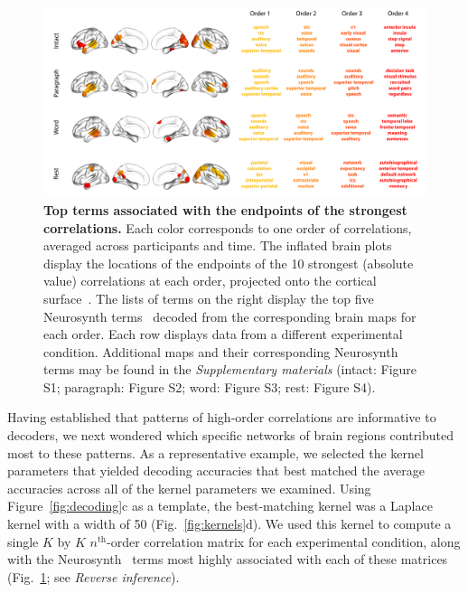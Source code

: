 \documentclass[english]{article}
\begin{document}
\begin{figure}[tp]
  \centering
  \includegraphics[width=\textwidth]{figs/most_abs}
  \caption{\textbf{Top terms associated with the endpoints of the
      strongest correlations.}  Each color corresponds to one order of
    correlations, averaged across participants and time. The inflated
    brain plots display the locations of the endpoints of the 10
    strongest (absolute value) correlations at each order, projected
    onto the cortical surface~\citep{CombEtal19}.  The lists of terms
    on the right display the top five Neurosynth
    terms~\citep{RubiEtal17} decoded from the corresponding brain maps
    for each order.  Each row displays data from a different
    experimental condition.  Additional maps and their corresponding
    Neurosynth terms may be found in the \textit{Supplementary
      materials} (intact: Figure S1; paragraph: Figure S2; word:
    Figure S3; rest: Figure S4).}
  \label{fig:neurosynth}
\end{figure}

Having established that patterns of high-order correlations are
informative to decoders, we next wondered which specific networks of
brain regions contributed most to these patterns.  As a representative
example, we selected the kernel parameters that yielded decoding
accuracies that best matched the average accuracies across all of the
kernel parameters we examined.  Using Figure~\ref{fig:decoding}c as a
template, the best-matching kernel was a Laplace kernel with a width
of 50 (Fig.~\ref{fig:kernels}d).  We used this kernel to compute a
single $K$ by $K$ $n^\mathrm{th}$-order correlation matrix for each
experimental condition, along with the Neurosynth~\citep{RubiEtal17}
terms most highly associated with each of these matrices
(Fig.~\ref{fig:neurosynth}; see \textit{Reverse inference}).
\end{document}
